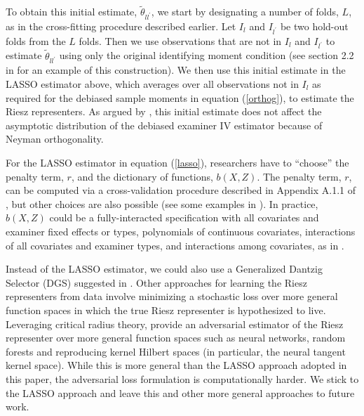 To obtain this initial estimate, $\tilde{\theta}_{l l^{\prime}}$, we start by designating a number of folds, $L$, as in the cross-fitting procedure described earlier. Let $I_l$ and $I_{l^{\prime}}$ be two hold-out folds from the $L$ folds. Then we use observations that are not in $I_l$ and $I_{l^{\prime}}$ to estimate $\tilde{\theta}_{l l^{\prime}}$ using only the original identifying moment condition (see section 2.2 in \citet{chernozhukov2022locally} for an example of this construction). We then use this initial estimate in the LASSO estimator above, which averages over all observations not in $I_l$ as required for the debiased sample moments in equation (\ref{orthog}), to estimate the Riesz representers. As argued by \citet{chernozhukov2022locally}, this initial estimate does not affect the asymptotic distribution of the debiased examiner IV estimator because of Neyman orthogonality.

For the LASSO estimator in equation (\ref{lasso}), researchers have to \enquote{choose} the penalty term, $r$, and the dictionary of functions, $b(X,Z)$. The penalty term, $r$, can be computed via a cross-validation procedure described in Appendix A.1.1 of \citet{chernozhukov2022automatic}, but other choices are also possible (see some examples in \citet{chernozhukov2022locally}). In practice, $b(X,Z)$ could be a fully-interacted specification with all covariates and examiner fixed effects or types, polynomials of continuous covariates, interactions of all covariates and examiner types, and interactions among covariates, as in \citet{chernozhukov2022debiased}.

Instead of the LASSO estimator, we could also use a Generalized Dantzig Selector (DGS) suggested in \citet{chernozhukov2022debiased}. Other approaches for learning the Riesz representers from data involve minimizing a stochastic loss over more general function spaces in which the true Riesz representer is hypothesized to live. Leveraging critical radius theory, \citet{chernozhukov2020adversarial} provide an adversarial estimator of the Riesz representer over more general function spaces such as neural networks, random forests and reproducing kernel Hilbert spaces (in particular, the neural tangent kernel space). While this is more general than the LASSO approach adopted in this paper, the adversarial loss formulation is computationally harder. We stick to the LASSO approach and leave this and other more general approaches to future work.

